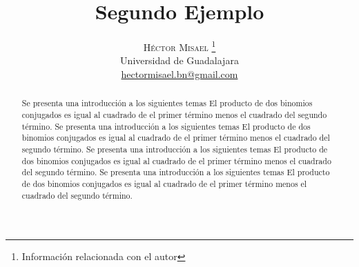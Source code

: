 \documentclass[12pt]{article}
\title{{\Huge\textbf{Segundo Ejemplo}}}
\author{\textsc{Héctor Misael}
\thanks{Información relacionada con el autor}\\[0.2cm]
\normalsize Universidad de Guadalajara \\
\normalsize 
\href{mailto:hectormisael.bn@gmail.com}{hectormisael.bn@gmail.com}
}
\begin{document}
\maketitle
\renewcommand{\contentsname}{Contenido}
\tableofcontents

\begin{abstract}
Se presenta una introducción a los siguientes temas El producto de dos binomios conjugados es igual al cuadrado de el primer término menos el cuadrado del segundo término.
Se presenta una introducción a los siguientes temas El producto de dos binomios conjugados es igual al cuadrado de el primer término menos el cuadrado del segundo término.
Se presenta una introducción a los siguientes temas El producto de dos binomios conjugados es igual al cuadrado de el primer término menos el cuadrado del segundo término.
Se presenta una introducción a los siguientes temas El producto de dos binomios conjugados es igual al cuadrado de el primer término menos el cuadrado del segundo término.
\end{abstract}
\end{document}
